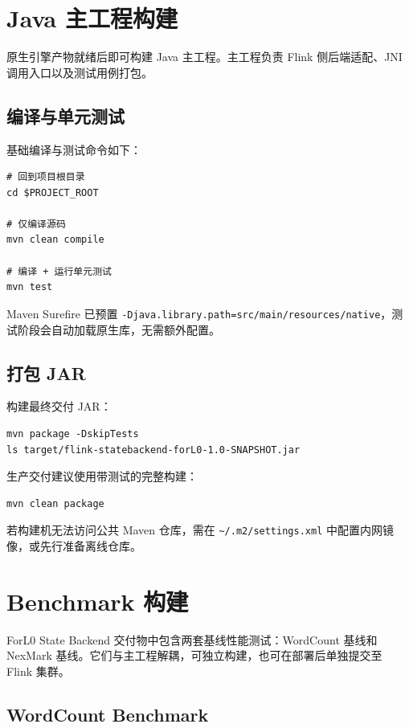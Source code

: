 \documentclass[a4paper,11pt]{article}
\newcommand{\project}{ForL0 State Backend}
\begin{document}
\section{Java 主工程构建}

原生引擎产物就绪后即可构建 Java 主工程。主工程负责 Flink 侧后端适配、JNI 调用入口以及测试用例打包。

\subsection{编译与单元测试}

基础编译与测试命令如下：

\begin{lstlisting}[language=shellcmd]
# 回到项目根目录
cd $PROJECT_ROOT

# 仅编译源码
mvn clean compile

# 编译 + 运行单元测试
mvn test
\end{lstlisting}

Maven Surefire 已预置 \texttt{-Djava.library.path=src/main/resources/native}，测试阶段会自动加载原生库，无需额外配置。

\subsection{打包 JAR}

构建最终交付 JAR：

\begin{lstlisting}[language=shellcmd]
mvn package -DskipTests
ls target/flink-statebackend-forL0-1.0-SNAPSHOT.jar
\end{lstlisting}

生产交付建议使用带测试的完整构建：

\begin{lstlisting}[language=shellcmd]
mvn clean package
\end{lstlisting}

若构建机无法访问公共 Maven 仓库，需在 \texttt{\textasciitilde/.m2/settings.xml} 中配置内网镜像，或先行准备离线仓库。

\section{Benchmark 构建}

\project{} 交付物中包含两套基线性能测试：WordCount 基线和 NexMark 基线。它们与主工程解耦，可独立构建，也可在部署后单独提交至 Flink 集群。

\subsection{WordCount Benchmark}
\end{document}
